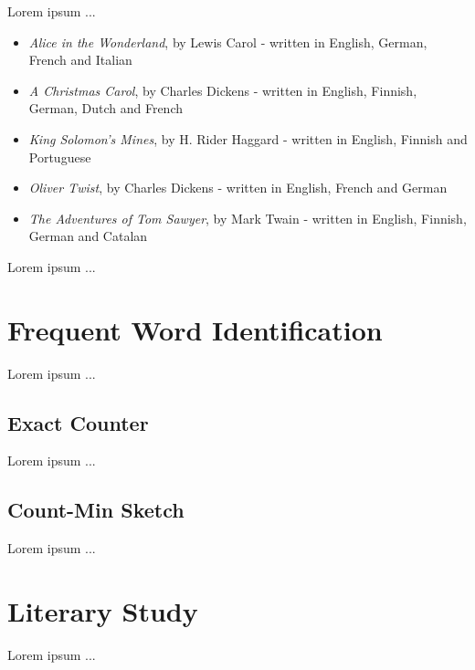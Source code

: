 \documentclass[shortpaper]{revdetua}
\begin{document}
Lorem ipsum ...

\begin{itemize}
    \item \textit{Alice in the Wonderland}, by Lewis Carol - written in English, German, French and Italian
    \item \textit{A Christmas Carol}, by Charles Dickens - written in English, Finnish, German, Dutch and French
    \item \textit{King Solomon's Mines}, by H. Rider Haggard - written in English, Finnish and Portuguese
    \item \textit{Oliver Twist}, by Charles Dickens - written in English, French and German
    \item \textit{The Adventures of Tom Sawyer}, by Mark Twain - written in English, Finnish, German and Catalan
\end{itemize}

Lorem ipsum ...


\section{Frequent Word Identification}

Lorem ipsum ...

\subsection{Exact Counter}

Lorem ipsum ...

\subsection{Count-Min Sketch}

Lorem ipsum ...


\section{Literary Study}

Lorem ipsum ...

\end{document}
